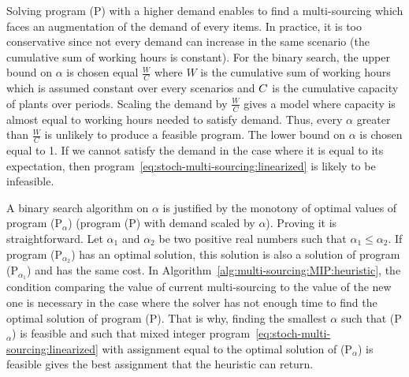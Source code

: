 Solving program (P) with a higher demand enables to find a multi-sourcing which faces an augmentation of the demand of every items.
In practice, it is too conservative since not every demand can increase in the same scenario (the cumulative sum of working hours is constant).
For the binary search, the upper bound on $\alpha$ is chosen equal $\frac{W}{C}$ where $W$ is the cumulative sum of working hours which is assumed constant over every scenarios and $C$ is the cumulative capacity of plants over periods.
Scaling the demand by $\frac{W}{C}$ gives a model where capacity is almost equal to working hours needed to satisfy demand.
Thus, every $\alpha$ greater than $\frac{W}{C}$ is unlikely to produce a feasible program.
The lower bound on $\alpha$ is chosen equal to 1.
If we cannot satisfy the demand in the case where it is equal to its expectation, then program~\eqref{eq:stoch-multi-sourcing:linearized} is likely to be infeasible.


A binary search algorithm on $\alpha$ is justified by the monotony of optimal values of program (P$_{\alpha}$) (\ie program (P) with demand scaled by $\alpha$).
Proving it is straightforward.
Let $\alpha_1$ and $\alpha_2$ be two positive real numbers such that $\alpha_1\le\alpha_2$. If program (P$_{\alpha_2}$) has an optimal solution, this solution is also a solution of program (P$_{\alpha_1}$) and has the same cost.
In Algorithm~\ref{alg:multi-sourcing:MIP:heuristic}, the condition comparing the value of current multi-sourcing to the value of the new one is necessary in the case where the solver has not enough time to find the optimal solution of program (P).
That is why, finding the smallest $\alpha$ such that (P$_{\alpha}$) is feasible and such that mixed integer program~\eqref{eq:stoch-multi-sourcing:linearized} with assignment equal to the optimal solution of (P$_{\alpha}$) is feasible gives the best assignment that the heuristic can return.


